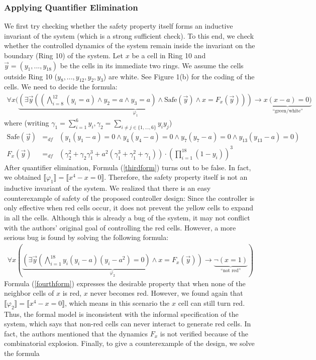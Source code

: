\documentclass[envcountsect]{llncs}
\begin{document}
{{\subsubsection{Applying Quantifier Elimination}
We first try checking whether the safety property itself forms an inductive invariant of the system (which is a strong sufficient check). To this end, we check whether the controlled dynamics of the system remain inside the invariant on the boundary (Ring 10) of the system. Let $x$ be a cell in Ring 10 and $\vec y = (y_1,...,y_{18})$ be the cells in its immediate two rings. We assume the cells outside Ring 10 ($y_8,...,y_{12},y_2,y_3$) are white. See Figure 1(b) for the coding of the cells. We need to decide the formula:
{\footnotesize\begin{eqnarray}\label{thirdform}\forall x(\underbrace{(\exists \vec y ((\bigwedge_{i=8}^{12} (y_i=a) \wedge y_2=a \wedge y_3=a)\wedge\mbox{Safe}(\vec y)\wedge x=F_x(\vec y)))}_{\varphi_1}\rightarrow \underbrace{x(x-a)=0)}_{\mbox{``green/white''}}\end{eqnarray}}
where (writing $\gamma_1=\sum_{i=1}^{6} y_i, \gamma_2 = \sum_{i\neq j\in \{1,...,6\}} y_iy_j$){\footnotesize\begin{eqnarray*}
\mbox{Safe}(\vec y)&=_{df}&(y_1(y_1-a) = 0\wedge y_4(y_4-a)=0\wedge y_7(y_7-a)=0\wedge y_{13}(y_{13}-a)=0)\\
F_x(\vec y)&=_{df}&(\gamma_2^2+ \gamma_2\gamma_1^3+a^2(\gamma_1^3+\gamma_1^2+\gamma_1))\cdot (\prod_{i=1}^{18}(1-y_i))^3
\end{eqnarray*}}After quantifier elimination, Formula (\ref{thirdform}) turns out to be false. In fact, we obtained $\llbracket \varphi_1\rrbracket = \llbracket x^4-x=0\rrbracket$. Therefore, the safety property itself is not an inductive invariant of the system. We realized that there is an easy counterexample of safety of the proposed controller design: Since the controller is only effective when red cells occur, it does not prevent the yellow cells to expand in all the cells. Although this is already a bug of the system, it may not conflict with the authors' original goal of controlling the red cells. However, a more serious bug is found by solving the following formula:
{\footnotesize 
\begin{eqnarray}\label{fourthform}\forall x (\underbrace{(\exists \vec y (\bigwedge_{i=1}^{18} y_i(y_i-a)(y_i-a^2)=0)\wedge x=F_x(\vec y))}_{\varphi_2}\rightarrow \underbrace{\neg(x=1)}_{\mbox{``not red''}})
\end{eqnarray}
}Formula (\ref{fourthform}) expresses the desirable property that when none of the neighbor cells of $x$ is red, $x$ never becomes red. However, we found again that $\llbracket \varphi_2\rrbracket = \llbracket x^4-x=0\rrbracket$, which means in this scenario the $x$ cell can still turn red. Thus, the formal model is inconsistent with the informal specification of the system, which says that non-red cells can never interact to generate red cells. In fact, the authors mentioned that the dynamics $F_x$ is not verified because of the combinatorial explosion. Finally, to give a counterexample of the design, we solve the formula
}}
\end{document}
